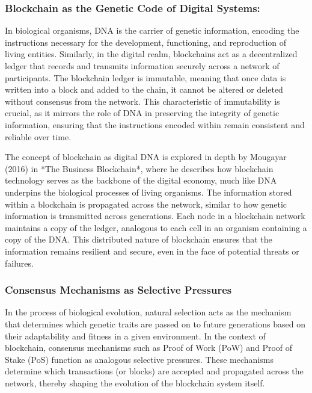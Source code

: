 \documentclass[12pt,twoside]{article}
\begin{document}
\subsubsection{Blockchain as the Genetic Code of Digital Systems:}

In biological organisms, DNA is the carrier of genetic information, encoding the instructions necessary for the development, functioning, and reproduction of living entities. Similarly, in the digital realm, blockchains act as a decentralized ledger that records and transmits information securely across a network of participants. The blockchain ledger is immutable, meaning that once data is written into a block and added to the chain, it cannot be altered or deleted without consensus from the network. This characteristic of immutability is crucial, as it mirrors the role of DNA in preserving the integrity of genetic information, ensuring that the instructions encoded within remain consistent and reliable over time.

The concept of blockchain as digital DNA is explored in depth by Mougayar (2016) in *The Business Blockchain*, where he describes how blockchain technology serves as the backbone of the digital economy, much like DNA underpins the biological processes of living organisms. The information stored within a blockchain is propagated across the network, similar to how genetic information is transmitted across generations. Each node in a blockchain network maintains a copy of the ledger, analogous to each cell in an organism containing a copy of the DNA. This distributed nature of blockchain ensures that the information remains resilient and secure, even in the face of potential threats or failures.

\subsubsection{Consensus Mechanisms as Selective Pressures}

In the process of biological evolution, natural selection acts as the mechanism that determines which genetic traits are passed on to future generations based on their adaptability and fitness in a given environment. In the context of blockchain, consensus mechanisms such as Proof of Work (PoW) and Proof of Stake (PoS) function as analogous selective pressures. These mechanisms determine which transactions (or blocks) are accepted and propagated across the network, thereby shaping the evolution of the blockchain system itself.
\end{document}
